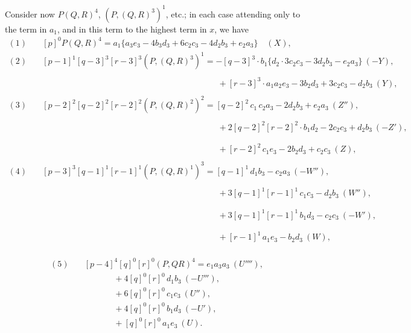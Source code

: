 \documentclass[11pt,a4paper]{article}
\begin{document}
Consider now $P(Q, R)^{4}$, $(P, (Q, R)^{3})^{1}$, etc.; in each case attending only to the term in $a_{1}$, and in this term to the highest term in $x$, we have
\begin{align*}
(1)\quad &[p]^{0} P(Q, R)^{4} = a_{1}\{a_{3}e_{3} - 4b_{3}d_{3} + 6c_{2}c_{3} - 4d_{2}b_{3} + e_{2}a_{3}\}\quad (X),\\
(2)\quad &[p-1]^{1}[q-3]^{3}[r-3]^{3}(P, (Q, R)^{3})^{1} = -[q-3]^{3}\cdot b_{1}\{d_{2}\cdot 3c_{2}c_{3} - 3d_{2}b_{3} - e_{2}a_{3}\}\ (-Y),\\
&\phantom{[p-1]^{1}[q-3]^{3}[r-3]^{3}(P, (Q, R)^{3})^{1} =}\ + [r-3]^{3}\cdot a_{1}a_{2}e_{3} - 3b_{2}d_{3} + 3c_{2}c_{3} - d_{2}b_{3}\ (Y),\\
(3)\quad &[p-2]^{2}[q-2]^{2}[r-2]^{2}(P, (Q, R)^{2})^{2} = [q-2]^{2}\,c_{1}\,c_{2}a_{3} - 2d_{2}b_{3} + e_{2}a_{3}\ (Z''),\\
&\phantom{[p-2]^{2}[q-2]^{2}[r-2]^{2}(P, (Q, R)^{2})^{2} =}\ + 2[q-2]^{2}[r-2]^{2}\cdot b_{1}d_{2} - 2c_{2}c_{3} + d_{2}b_{3}\ (-Z'),\\
&\phantom{[p-2]^{2}[q-2]^{2}[r-2]^{2}(P, (Q, R)^{2})^{2} =}\ + [r-2]^{2}\,c_{1}e_{3} - 2b_{2}d_{3} + c_{2}c_{3}\ (Z),\\
(4)\quad &[p-3]^{3}[q-1]^{1}[r-1]^{1}(P, (Q, R)^{1})^{3} = [q-1]^{1}\,d_{1}b_{3} - c_{2}a_{3}\ (-W''),\\
&\phantom{[p-3]^{3}[q-1]^{1}[r-1]^{1}(P, (Q, R)^{1})^{3} =}\ + 3[q-1]^{1}[r-1]^{1}\,c_{1}c_{3} - d_{2}b_{3}\ (W''),\\
&\phantom{[p-3]^{3}[q-1]^{1}[r-1]^{1}(P, (Q, R)^{1})^{3} =}\ + 3[q-1]^{1}[r-1]^{1}\,b_{1}d_{3} - c_{2}c_{3}\ (-W'),\\
&\phantom{[p-3]^{3}[q-1]^{1}[r-1]^{1}(P, (Q, R)^{1})^{3} =}\ + [r-1]^{1}\,a_{1}e_{3} - b_{2}d_{3}\ (W),
\end{align*}

\newpage


\begin{align*}
(5)\quad &[p-4]^{4}[q]^{0}[r]^{0}(P, QR)^{4} = e_{1}a_{3}a_{3}\ (U''''),\\
&\phantom{(5)\quad}\ + 4[q]^{0}[r]^{0}\,d_{1}b_{3}\ (-U'''),\\
&\phantom{(5)\quad}\ + 6[q]^{0}[r]^{0}\,c_{1}c_{3}\ (U''),\\
&\phantom{(5)\quad}\ + 4[q]^{0}[r]^{0}\,b_{1}d_{3}\ (-U'),\\
&\phantom{(5)\quad}\ + [q]^{0}[r]^{0}\,a_{1}e_{3}\ (U).
\end{align*}
\end{document}
